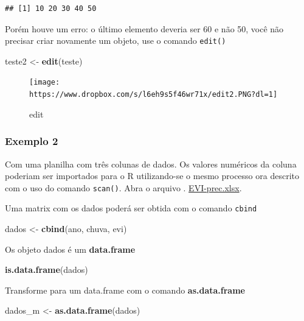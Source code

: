 \documentclass[
]{book}
\newenvironment{Shaded}{\begin{snugshade}}{\end{snugshade}}
\newcommand{\KeywordTok}[1]{\textcolor[rgb]{0.13,0.29,0.53}{\textbf{#1}}}
\newcommand{\NormalTok}[1]{#1}
\newcommand{\StringTok}[1]{\textcolor[rgb]{0.31,0.60,0.02}{#1}}
\begin{document}
\begin{verbatim}
## [1] 10 20 30 40 50
\end{verbatim}

Porém houve um erro: o último elemento deveria ser 60 e não 50, você não precisar criar novamente um objeto, use o comando \texttt{edit()}

\begin{Shaded}
\begin{Highlighting}[]
\NormalTok{teste2 <-}\StringTok{ }\KeywordTok{edit}\NormalTok{(teste)}
\end{Highlighting}
\end{Shaded}

\begin{figure}
\centering
\texttt{[image: https://www.dropbox.com/s/l6eh9s5f46wr71x/edit2.PNG?dl=1]}
\caption{edit}
\end{figure}

\hypertarget{exemplo-2}{%
\subsubsection{Exemplo 2}\label{exemplo-2}}

Com uma planilha com três colunas de dados. Os valores numéricos da coluna poderiam ser importados para o R utilizando-se o mesmo processo ora descrito com o uso do comando \texttt{scan()}. Abra o arquivo . \href{https://www.dropbox.com/s/6504oo4olw34dw9/EVI_Prec.xlsx?dl=1}{EVI-prec.xlsx}.

Uma matrix com os dados poderá ser obtida com o comando \texttt{cbind}

\begin{Shaded}
\begin{Highlighting}[]
\NormalTok{dados <-}\StringTok{ }\KeywordTok{cbind}\NormalTok{(ano, chuva, evi)}
\end{Highlighting}
\end{Shaded}

Os objeto dados é um \textbf{data.frame}

\begin{Shaded}
\begin{Highlighting}[]
\KeywordTok{is.data.frame}\NormalTok{(dados)}
\end{Highlighting}
\end{Shaded}

Transforme para um data.frame com o comando \textbf{as.data.frame}

\begin{Shaded}
\begin{Highlighting}[]
\NormalTok{dados_m <-}\StringTok{ }\KeywordTok{as.data.frame}\NormalTok{(dados)}
\end{Highlighting}
\end{Shaded}
\end{document}
